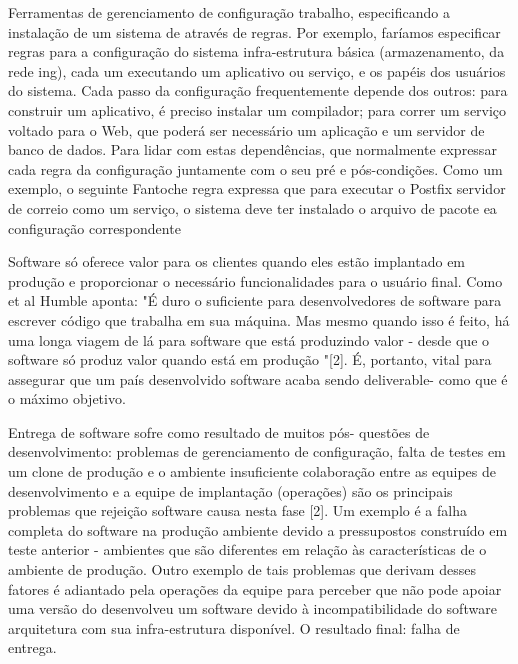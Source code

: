 Ferramentas de gerenciamento de configuração trabalho, especificando a instalação de um sistema de
através de regras. Por exemplo, faríamos
especificar regras para a configuração do sistema
infra-estrutura básica (armazenamento, da rede
ing), cada um executando um aplicativo ou
serviço, e os papéis dos usuários do sistema. Cada passo da configuração frequentemente
depende dos outros: para construir um aplicativo, é preciso instalar um compilador; para correr
um serviço voltado para o Web, que poderá ser necessário um
aplicação e um servidor de banco de dados. Para
lidar com estas dependências, que normalmente
expressar cada regra da configuração juntamente com o seu pré e pós-condições.
Como um exemplo, o seguinte Fantoche
regra expressa que para executar o Postfix
servidor de correio como um serviço, o sistema deve
ter instalado o arquivo de pacote ea configuração correspondente \cite{6265084}



Software só oferece valor para os clientes quando eles estão
implantado em produção e proporcionar o necessário
funcionalidades para o usuário final. Como et al Humble aponta:
"É duro o suficiente para desenvolvedores de software para escrever código que
trabalha em sua máquina. Mas mesmo quando isso é feito, há uma
longa viagem de lá para software que está produzindo valor -
desde que o software só produz valor quando está em
produção "[2]. É, portanto, vital para assegurar que um país desenvolvido
software acaba sendo deliverable- como que é o máximo
objetivo. \cite{akerele2013system}


Entrega de software sofre como resultado de muitos pós-
questões de desenvolvimento: problemas de gerenciamento de configuração,
falta de testes em um clone de produção e o ambiente
insuficiente colaboração entre as equipes de desenvolvimento e
a equipe de implantação (operações) são os principais problemas que
rejeição software causa nesta fase [2]. Um exemplo é a
falha completa do software na produção
ambiente devido a pressupostos construído em teste anterior
- ambientes que são diferentes em relação às características de
o ambiente de produção. Outro exemplo de tais
problemas que derivam desses fatores é adiantado pela
operações da equipe para perceber que não pode apoiar uma versão do
desenvolveu um software devido à incompatibilidade do software
arquitetura com sua infra-estrutura disponível. O resultado final:
falha de entrega.\cite{akerele2013system}



